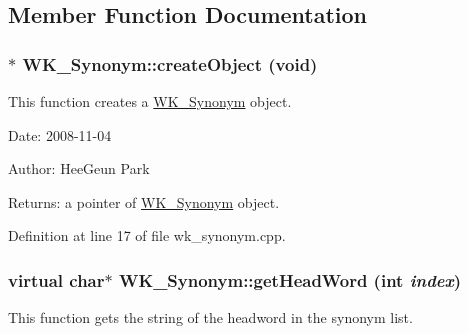 \subsection{Member Function Documentation}
\hypertarget{classWK__Synonym_824bece2d0ac214d9727afabaf3339a3}{
\subsubsection[{createObject}]{ $\ast$ WK\_\-Synonym::createObject (void)}}
\label{classWK__Synonym_824bece2d0ac214d9727afabaf3339a3}


This function creates a \hyperlink{classWK__Synonym}{WK\_\-Synonym} object. 

\begin{Desc}
\item[Date:]2008-11-04 \end{Desc}
\begin{Desc}
\item[Author:]HeeGeun Park \end{Desc}
\begin{Desc}
\item[Returns:]a pointer of \hyperlink{classWK__Synonym}{WK\_\-Synonym} object. \end{Desc}


Definition at line 17 of file wk\_\-synonym.cpp.\hypertarget{classWK__Synonym_50cacdd04cddb986eed20886aad03351}{
\subsubsection[{getHeadWord}]{\setlength{\rightskip}{0pt plus 5cm}virtual char$\ast$ WK\_\-Synonym::getHeadWord (int {\em index})}}
\label{classWK__Synonym_50cacdd04cddb986eed20886aad03351}


This function gets the string of the headword in the synonym list. 

